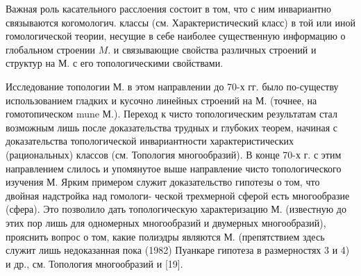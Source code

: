 \documentclass[10pt]{article}
\begin{document}
Важная роль касательного расслоения состоит в том, что с ним инвариантно связываются когомологич. классы (см. Характеристический класс) в той или иной гомологической теории, несущие в себе наиболее существенную информацию о глобальном строении $M$. и связывающие свойства различных строений и структур на М. с его топологическими свойствами.



Исследование топологии М. в этом направлении до 70-х гг. было по-существу использованием гладких и кусочно линейных строений на М. (точнее, на гомотопическом mune М.). Переход к чисто топологическим результатам стал возможным лишь после доказательства трудных и глубоких теорем, начиная с доказательства топологической инвариантности характеристических (рациональных) классов (см. Топология многообразий). В конце 70-х г. с этим направлением слилось и упомянутое выше направление чисто топологического изучения М. Ярким примером служит доказательство гипотезы о том, что двойная надстройка над гомологи- ческой трехмерной сферой есть многообразие (сфера). Это позволило дать топологическую характеризацию М. (известную до этих пор лишь для одномерных многообразий и двумерных многообразий), прояснить вопрос о том, какие полиэдры являются М. (препятствием здесь служит лишь недоказанная пока (1982) Пуанкаре гипотеза в размерностях 3 и 4) и др., см. Топология многообразий и [19].
\end{document}
